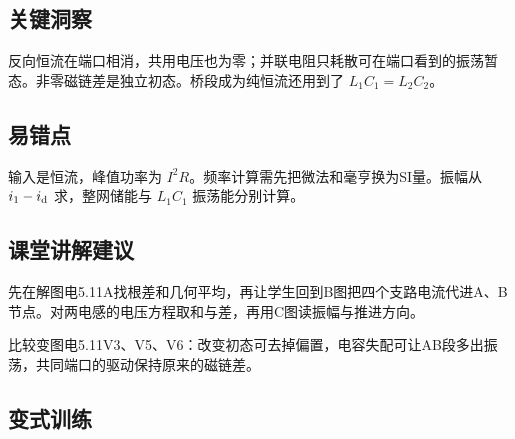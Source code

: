 \documentclass[UTF8,fontset=fandol,a4paper,11pt]{ctexart}
\begin{document}


\subsection*{关键洞察}

反向恒流在端口相消，共用电压也为零；并联电阻只耗散可在端口看到的振荡暂态。非零磁链差是独立初态。桥段成为纯恒流还用到了 $L_1C_1=L_2C_2$。



\subsection*{易错点}

输入是恒流，峰值功率为 $I^2R$。频率计算需先把微法和毫亨换为SI量。振幅从 $i_1-i_{\rm d}$ 求，整网储能与 $L_1C_1$ 振荡能分别计算。



\subsection*{课堂讲解建议}

先在解图电5.11A找根差和几何平均，再让学生回到B图把四个支路电流代进A、B节点。对两电感的电压方程取和与差，再用C图读振幅与推进方向。

比较变图电5.11V3、V5、V6：改变初态可去掉偏置，电容失配可让AB段多出振荡，共同端口的驱动保持原来的磁链差。


\subsection*{变式训练}
\end{document}
